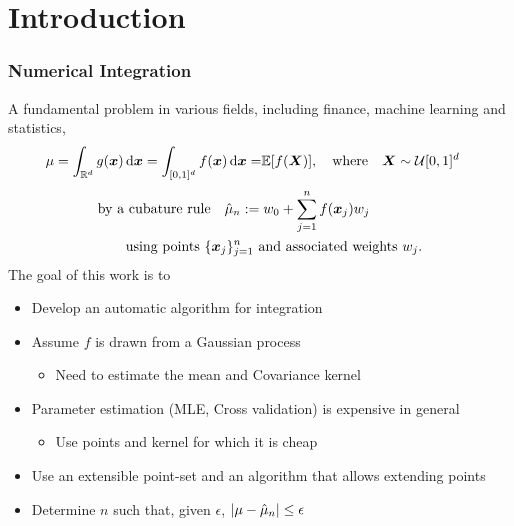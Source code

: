 \documentclass[handout, 10pt,compress,xcolor={usenames,dvipsnames}]{beamer} %
\newcommand{\Ex}{\mathbb{E}}
\newcommand{\errtol}{{\epsilon}}
\newcommand{\pause}{}
\def\abs#1{\ensuremath{\left \lvert #1 \right \rvert}}
\begin{document}
\section{Introduction}
\frame
{
\frametitle{Numerical Integration}
\vspace{-5ex}
A fundamental problem in various fields, including finance, machine learning and statistics,
\vspace{-2ex}
\begin{align}
\label{eqn:defn_mu}
\mu = \int_{\reals^d} g(\vx) \,  \dif \vx = \int_{[0,1]^d} f(\vx) \,
\dif\vx  = & \Ex[f(\vX)], \quad \text{where} \quad \vX \sim \cu [0,1]^d
\end{align}
\vspace{-5ex}
\begin{align*}
 &\text{by a  cubature rule} \quad
\hmu_n := w_0 + \sum_{j=1}^{n} f(\vx_j) w_j \qquad
\\  \vspace{-2ex}
& \qquad \text{using  points $\{\vx_j \}_{j=1}^{n}$ and associated weights $w_j$.}
\end{align*}
\vspace{-1ex}
\pause %
The goal of this work is to
\vspace{-2ex}
\begin{itemize}
\item Develop an automatic algorithm for integration
\item Assume \alert{$f$} is drawn from a Gaussian process 
\begin{itemize}
	\item Need to estimate the mean and Covariance kernel
\end{itemize}
\item Parameter estimation (MLE, Cross validation) is expensive in general
\begin{itemize}
\item Use points and kernel for which it is cheap
\end{itemize}
\item Use an \alert{extensible} point-set and an algorithm that allows extending points 
\item Determine \alert{$n$} such that, given \alert{$\errtol$}, $\abs{\mu-\hmu_n} \leq \errtol$
\end{itemize}
}
\end{document}
